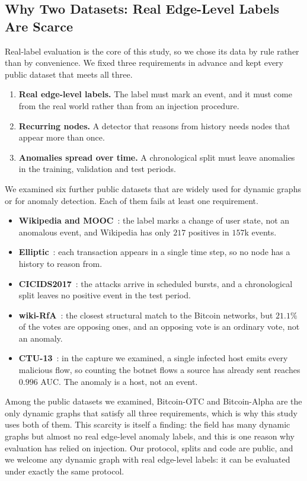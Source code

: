\documentclass[pdflatex,sn-basic]{sn-jnl}
\theoremstyle{definition}
\theoremstyle{plain}
\begin{document}
\subsection{Why Two Datasets: Real Edge-Level Labels Are Scarce}
\label{sec:whytwo}
Real-label evaluation is the core of this study, so we chose its data by rule
rather than by convenience. We fixed three requirements in advance and kept
every public dataset that meets all three.
\begin{enumerate}
\item \textbf{Real edge-level labels.} The label must mark an event, and it
must come from the real world rather than from an injection procedure.
\item \textbf{Recurring nodes.} A detector that reasons from history needs
nodes that appear more than once.
\item \textbf{Anomalies spread over time.} A chronological split must leave
anomalies in the training, validation and test periods.
\end{enumerate}
We examined six further public datasets that are widely used for dynamic
graphs or for anomaly detection. Each of them fails at least one requirement.
\begin{itemize}
\item \textbf{Wikipedia and MOOC}~\cite{jodie}: the label marks a change of
user state, not an anomalous event, and Wikipedia has only $217$ positives in
$157$k events.
\item \textbf{Elliptic}~\cite{elliptic}: each transaction appears in a single
time step, so no node has a history to reason from.
\item \textbf{CICIDS2017}~\cite{cicids}: the attacks arrive in scheduled
bursts, and a chronological split leaves no positive event in the test period.
\item \textbf{wiki-RfA}~\cite{wikirfa}: the closest structural match to the
Bitcoin networks, but $21.1\%$ of the votes are opposing ones, and an
opposing vote is an ordinary vote, not an anomaly.
\item \textbf{CTU-13}~\cite{ctu13}: in the capture we examined, a single
infected host emits every malicious flow, so counting the botnet flows a
source has already sent reaches $0.996$ AUC. The anomaly is a host, not an
event.
\end{itemize}
Among the public datasets we examined, Bitcoin-OTC and Bitcoin-Alpha are the
only dynamic graphs that satisfy all three requirements, which is why this study uses both
of them. This scarcity is itself a finding: the field has many dynamic graphs
but almost no real edge-level anomaly labels, and this is one reason why
evaluation has relied on injection. Our protocol, splits and code are public,
and we welcome any dynamic graph with real edge-level labels: it can be
evaluated under exactly the same protocol.
\end{document}

